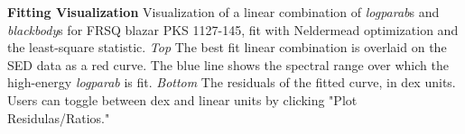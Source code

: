\textbf{\label{fig:fitting_window} Fitting Visualization} Visualization of a linear combination of {\it{logparab}}s and {\it{blackbody}}s for FRSQ blazar PKS 1127-145, fit with Neldermead optimization and the least-square statistic. {\it{Top}} The best fit linear combination is overlaid on the SED data as a red curve. The blue line shows the spectral range over which the high-energy {\it{logparab}} is fit. {\it{Bottom}} The residuals of the fitted curve, in dex units. Users can toggle between dex and linear units by clicking "Plot Residulas/Ratios."
